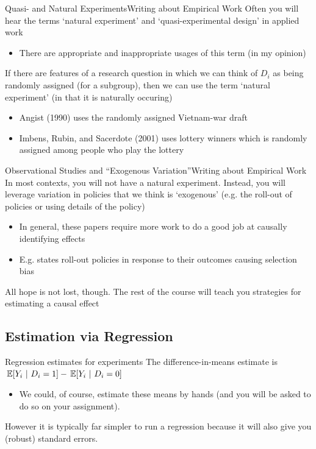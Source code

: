 \documentclass[aspectratio=169,t,11pt,table]{beamer}
\begin{document}
\begin{frame}{Quasi- and Natural Experiments}{Writing about Empirical Work}
  Often you will hear the terms `natural experiment' and `quasi-experimental design' in applied work
  \begin{itemize}
    \item There are appropriate and inappropriate usages of this term (in my opinion)
  \end{itemize}

  \bigskip
  If there are features of a research question in which we can think of $D_i$ as being randomly assigned (for a subgroup), then we can use the term `natural experiment' (in that it is naturally occuring)
  \begin{itemize}
    \item Angist (1990) uses the randomly assigned Vietnam-war draft
    \item Imbens, Rubin, and Sacerdote (2001) uses lottery winners which is randomly assigned among people who play the lottery
  \end{itemize}
\end{frame}

\begin{frame}{Observational Studies and ``Exogenous Variation''}{Writing about Empirical Work}
  In most contexts, you will not have a natural experiment. Instead, you will leverage variation in policies that we think is `exogenous' (e.g. the roll-out of policies or using details of the policy)

  \begin{itemize}
    \item In general, these papers require more work to do a good job at causally identifying effects
    
    \item E.g. states roll-out policies in response to their outcomes causing selection bias
  \end{itemize}

  \pause
  \bigskip
  All hope is not lost, though. The rest of the course will teach you strategies for estimating a causal effect
\end{frame}

\subsection{Estimation via Regression}

\begin{frame}{Regression estimates for experiments}
  The difference-in-means estimate is $\expec{Y_i}{D_i = 1} - \expec{Y_i}{D_i = 0}$
  \begin{itemize}
    \item We could, of course, estimate these means by hands (and you will be asked to do so on your assignment). 
  \end{itemize}

  However it is typically far simpler to run a regression because it will also give you (robust) standard errors. 
\end{frame}
\end{document}
